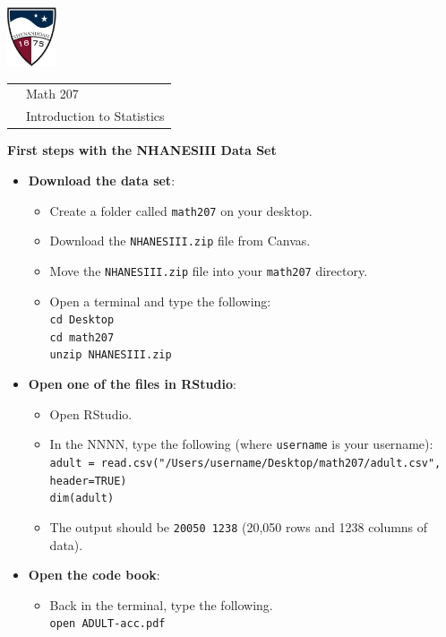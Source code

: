 \documentclass[10pt]{article}
\begin{document}
\pagestyle{empty}
\lstset{language=R, showspaces=false, showstringspaces=false}

\href{http://www.su.edu}{\includegraphics[height=1.75cm]{sulogo.eps}}
\vspace{-1.69cm}

{\small \hfill
\begin{tabular}{cl}
& Math 207\\& Introduction to Statistics\\
\end{tabular}
}
\setlength{\baselineskip}{1.05\baselineskip}
\medskip
\medskip

\begin{center}
\textbf{\large  First steps with the  NHANESIII Data Set}
\end{center}


\begin{itemize}
\item \textbf{Download the data set}:
\begin{itemize}
\item Create a folder called \texttt{math207} on your desktop.
\item Download the \texttt{NHANESIII.zip} file from Canvas.
\item Move the \texttt{NHANESIII.zip} file into your \texttt{math207} directory.
\item Open a terminal and type the following:\\
  \texttt{cd  Desktop}\\
  \texttt{cd  math207}\\
  \texttt{unzip  NHANESIII.zip}\\
\end{itemize}
%
\item \textbf{Open one of the files in RStudio}:
  \begin{itemize}
  \item Open RStudio.
  \item In the NNNN, type the following (where \texttt{username} is your username):\\
      \texttt{adult = read.csv("/Users/username/Desktop/math207/adult.csv", header=TRUE)}\\
      \texttt{dim(adult)}
  \item The output should be \texttt{20050  1238}  (20,050 rows and 1238 columns of data).\\
  \end{itemize}
\item \textbf{Open the code book}:
  \begin{itemize}
  \item Back in the terminal, type the following.\\
      \texttt{open  ADULT-acc.pdf}
  \end{itemize}
\end{itemize}

\vfill
\eject
\end{document}
